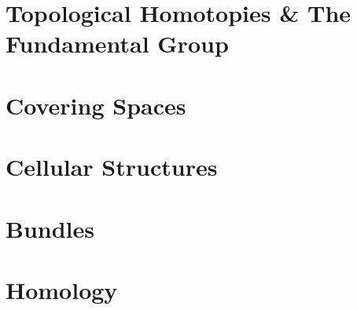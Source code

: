 \documentclass[../../../deep-dive]{subfiles}
\begin{document}
\chapter{Topological Homotopies \& The Fundamental Group}



\chapter{Covering Spaces}



\chapter{Cellular Structures}



\chapter{Bundles}



\chapter{Homology}


\end{document}
